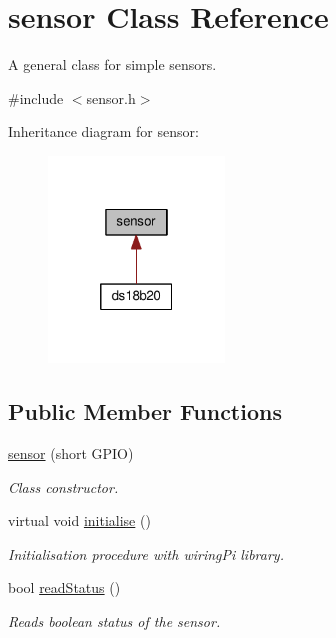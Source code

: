 \hypertarget{classsensor}{}\section{sensor Class Reference}
\label{classsensor}


A general class for simple sensors.  




{\ttfamily \#include $<$sensor.\+h$>$}



Inheritance diagram for sensor\+:
\nopagebreak
\begin{figure}[H]
\begin{center}
\leavevmode
\includegraphics[width=133pt]{classsensor__inherit__graph}
\end{center}
\end{figure}
\subsection*{Public Member Functions}
\begin{DoxyCompactItemize}
\item 
\mbox{\label{classsensor_a3341a98b9c6b4f0e0234f205941f4342}} 
\mbox{\hyperlink{classsensor_a3341a98b9c6b4f0e0234f205941f4342}{sensor}} (short G\+P\+IO)
\begin{DoxyCompactList}\small\item\em Class constructor. \end{DoxyCompactList}\item 
\mbox{\label{classsensor_ae1073389f46dd119e2f421a894b7d781}} 
virtual void \mbox{\hyperlink{classsensor_ae1073389f46dd119e2f421a894b7d781}{initialise}} ()
\begin{DoxyCompactList}\small\item\em Initialisation procedure with wiring\+Pi library. \end{DoxyCompactList}\item 
\mbox{\label{classsensor_a111c7b59fb50d61c0e44e689b8eb94f9}} 
bool \mbox{\hyperlink{classsensor_a111c7b59fb50d61c0e44e689b8eb94f9}{read\+Status}} ()
\begin{DoxyCompactList}\small\item\em Reads boolean status of the sensor. \end{DoxyCompactList}\end{DoxyCompactItemize}
